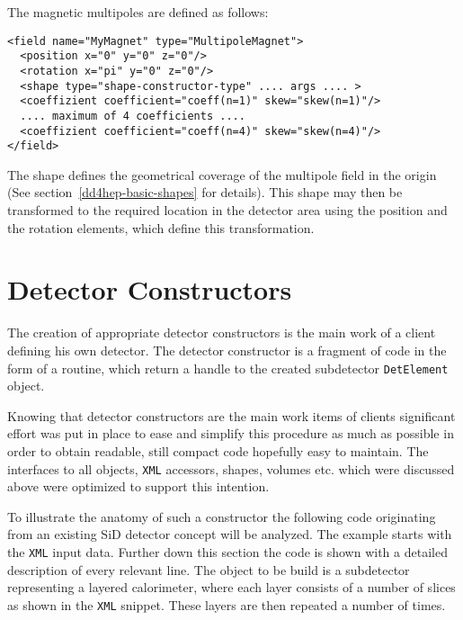The magnetic multipoles are defined as follows:
\begin{verbatim}
<field name="MyMagnet" type="MultipoleMagnet">
  <position x="0" y="0" z="0"/>
  <rotation x="pi" y="0" z="0"/>
  <shape type="shape-constructor-type" .... args .... >
  <coeffizient coefficient="coeff(n=1)" skew="skew(n=1)"/>
  .... maximum of 4 coefficients ....
  <coeffizient coefficient="coeff(n=4)" skew="skew(n=4)"/>
</field>
\end{verbatim}
The shape defines the geometrical coverage of the multipole  field in the origin (See section~\ref{dd4hep-basic-shapes} for details).  This shape may then be transformed to the required location in the detector area using the position  and the rotation elements, which define this transformation.


\section{Detector Constructors}
\label{sec:dd4hep-manual-detector-constructors}

The creation of appropriate detector constructors is the main work of a client defining his own detector. The detector constructor is a fragment of code in the  form of a routine, which return a handle to the created subdetector \texttt{DetElement} object.

Knowing that detector constructors are the main work items of clients significant  effort was put in place to ease and simplify this procedure as much as possible in order to obtain readable, still compact code hopefully easy to maintain. The interfaces to all objects, \texttt{XML} accessors, shapes, volumes etc. which were  discussed above were optimized to support this intention.

To illustrate the anatomy of such a constructor the following code originating from an existing SiD detector concept will be analyzed. The example starts with the \texttt{XML} input data. Further down this section the code is shown with a detailed description of every relevant line. The object to be build is a subdetector representing a layered calorimeter,  where each layer consists of a number of slices as shown in the \texttt{XML} snippet. These layers are then repeated a number of times.

